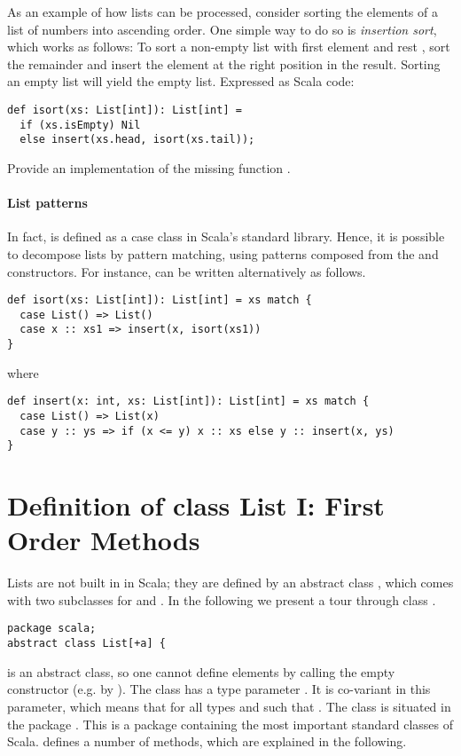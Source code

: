 As an example of how lists can be processed, consider sorting the
elements of a list of numbers into ascending order. One simple way to
do so is {\em insertion sort}, which works as follows: To sort a
non-empty list with first element  and rest , sort
the remainder  and insert the element  at the right
position in the result. Sorting an empty list will yield the
empty list. Expressed as Scala code:
\begin{lstlisting}
def isort(xs: List[int]): List[int] =
  if (xs.isEmpty) Nil
  else insert(xs.head, isort(xs.tail));
\end{lstlisting}

\begin{exercise} Provide an implementation of the missing function
.
\end{exercise}

\paragraph{List patterns} In fact, \code{::} is defined as a case
class in Scala's standard library. Hence, it is possible to decompose
lists by pattern matching, using patterns composed from the 
and \code{::} constructors. For instance,  can be written
alternatively as follows.
\begin{lstlisting}
def isort(xs: List[int]): List[int] = xs match {
  case List() => List()
  case x :: xs1 => insert(x, isort(xs1))
}
\end{lstlisting}
where
\begin{lstlisting}
def insert(x: int, xs: List[int]): List[int] = xs match {
  case List() => List(x)
  case y :: ys => if (x <= y) x :: xs else y :: insert(x, ys)
}
\end{lstlisting}

\section{Definition of class List I: First Order Methods}
\label{sec:list-first-order}

Lists are not built in in Scala; they are defined by an abstract class
, which comes with two subclasses for \code{::} and .
In the following we present a tour through class .
\begin{lstlisting}
package scala;
abstract class List[+a] {
\end{lstlisting}
 is an abstract class, so one cannot define elements by
calling the empty  constructor (e.g. by
).  The class has a type parameter . It is
co-variant in this parameter, which means that
 for all types  and  such that
.  The class is situated in the package
. This is a package containing the most important standard
classes of Scala.
  defines a number of methods, which are
explained in the following.

